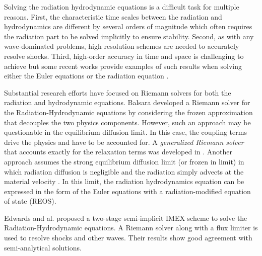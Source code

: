 \documentclass[review]{elsarticle}
\begin{document}
Solving the radiation hydrodynamic equations is a difficult task for multiple reasons. First, the characteristic time scales between the radiation and hydrodynamics are different by several orders of magnitude which often requires the radiation part to be solved implicitly to ensure stability. Second, as with any wave-dominated problems, high resolution schemes are needed to accurately resolve shocks. Third, high-order accuracy in time and space is challenging to achieve but some recent works provide examples of such results when solving either the Euler equations \cite{Hussaini, jlg1, jlg2, Leveque} or the radiation equation \cite{nse_ragusa_wang,jcp_ragusa_wang}. 

Substantial research efforts have focused on Riemann solvers for both the radiation and hydrodynamic equations. Balsara \cite{Balsara} developed a Riemann solver for the Radiation-Hydrodynamic equations by considering the frozen approximation that decouples the two physics components. However, such an approach may be questionable in the equilibrium diffusion limit. In this case, the coupling terms drive the physics and have to be accounted for. A \emph{generalized Riemann solver} that accounts exactly for the relaxation terms was developed in \cite{LowrieMorelHittinger}. Another approach assumes the strong equilibrium diffusion limit (or frozen in limit) in which radiation diffusion is negligible and the radiation simply advects at the material velocity \cite{Woodward}. In this limit, the radiation hydrodynamics equation can be expressed in the form of the Euler equations with a radiation-modified equation of state (REOS). 

Edwards and al. \cite{EdwardsMorelLowrie} proposed a two-stage semi-implicit IMEX scheme to solve the Radiation-Hydrodynamic equations. A Riemann solver along with a flux limiter is used to resolve shocks and other waves. Their results show good agreement with semi-analytical solutions. 
\end{document}
